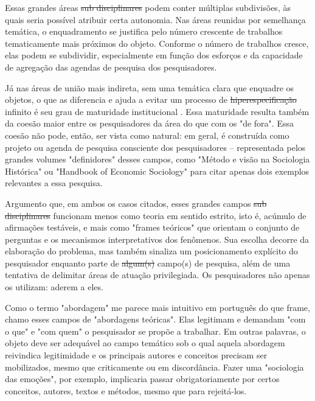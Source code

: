 Essas grandes áreas \sout{sub disciplinares}
podem conter múltiplas subdivisões, às quais seria possível atribuir certa autonomia. Nas áreas reunidas por semelhança temática, o enquadramento se justifica pelo número crescente de trabalhos tematicamente mais próximos do objeto. Conforme o número de trabalhos cresce, elas podem se subdividir, especialmente em função dos esforços e da capacidade de agregação das agendas de pesquisa dos pesquisadores.

Já nas áreas de união mais indireta, sem uma temática clara que enquadre os objetos, o que as diferencia e ajuda
a evitar um processo de \sout{hiperespecificação} infinito
é seu grau de maturidade institucional . Essa maturidade resulta também da coesão maior entre os pesquisadores da área do que com os "de fora". Essa coesão não pode, então, ser vista como natural: em geral, é construída como projeto ou agenda de pesquisa consciente dos pesquisadores -- representada pelos grandes volumes "definidores" desses campos, como "Método e visão
na Sociologia Histórica"  ou "Handbook of Economic Sociology"  para citar apenas dois exemplos relevantes a essa pesquisa.

Argumento que, em ambos os casos citados, esses grandes campos \sout{sub disciplinares} funcionam menos como teoria em sentido estrito, isto é, acúmulo de afirmações testáveis, e mais
como "frames teóricos"  que orientam o conjunto de perguntas e os mecanismos interpretativos dos fenômenos.
Sua escolha decorre da elaboração do problema, mas também sinaliza um posicionamento explícito do pesquisador
enquanto parte de \sout{algum(s)} campo(s) de pesquisa, além de uma tentativa de delimitar áreas de atuação privilegiada. Os pesquisadores não apenas os utilizam: aderem a eles.

Como o termo "abordagem" me parece mais intuitivo em português do que frame, chamo esses campos de "abordagens teóricas". Elas legitimam e demandam  "com o que" e "com quem" o pesquisador se propõe a trabalhar. Em outras palavras, o objeto deve ser adequável ao campo temático sob o qual aquela
abordagem reivindica legitimidade e os principais autores e conceitos precisam ser mobilizados, mesmo que criticamente ou em
discordância. Fazer uma "sociologia das emoções", por exemplo, implicaria passar obrigatoriamente por certos conceitos, autores, textos e métodos, mesmo que para rejeitá-los.

